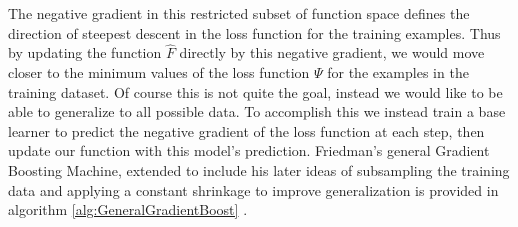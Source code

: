 \documentclass[9pt, conference]{IEEEtran}
\begin{document}
The negative gradient in this restricted subset of function space defines the direction of steepest descent in the loss function for the training examples. Thus by updating the function \(\hat{F}\) directly by this negative gradient, we would move closer to the minimum values of the loss function \(\Psi\) for the examples in the training dataset. Of course this is not quite the goal, instead we would like to be able to generalize to all possible data. To accomplish this we instead train a base learner to predict the negative gradient of the loss function at each step, then update our function with this model's prediction. Friedman's general Gradient Boosting Machine, extended to include his later ideas of subsampling the training data and applying a constant shrinkage to improve generalization is provided in algorithm \ref{alg:GeneralGradientBoost} \cite{2012ridgeway} \cite{2001Friedman} \cite{2002Friedman}. 
\end{document}

